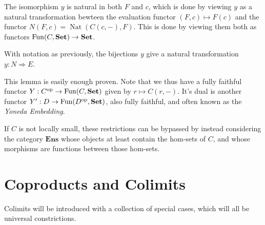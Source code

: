 The isomorphism $y$ is natural in both $F$ and $c$, which is done by viewing $y$ as a natural transformation bewteen the evaluation functor $(F,c)\mapsto F(c)$ and the functor $N(F,c)=\operatorname{Nat} (C(c,-),F)$. This is done by viewing them both as functors $\operatorname{Fun} (C,\mathbf{Set} )\to \mathbf{Set} $.

\begin{lemma}[Yoneda]\label{lma:3.2}
	With notation as previously, the bijections $y$ give a natural transformation $y : N \Rightarrow E$.
\end{lemma}

This lemma is easily enough proven. Note that we thus have a fully faithful functor $Y : C^{\mathrm{op} }  \to \operatorname{Fun} (C,\mathbf{Set} )$ given by $r\mapsto C(r,-)$. It's dual is another functor $Y': D \to \operatorname{Fun} (D^{\mathrm{op} } ,\mathbf{Set} )$, also fully faithful, and often known as the \emph{Yoneda Embedding}.

If $C$ is not locally small, these restrictions can be bypassed by instead considering the category $\mathbf{Ens} $ whose objects at least contain the hom-sets of $C$, and whose morphisms are functions between those hom-sets.

\section{Coproducts and Colimits}

Colimits will be introduced with a collection of special cases, which will all be universal constrictions.

